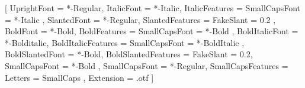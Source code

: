 \usepackage[
    math-style=ISO, bold-style=ISO,
    partial=upright,
    mathrm=sym, mathit=sym, mathsf=sym, mathbf=sym, mathtt=sym,
    warnings-off={mathtools-colon,mathtools-overbracket},
]{unicode-math}


%

\setmainfont{PalatineP}[
    UprightFont = *-Regular,
    ItalicFont = *-Italic,
    ItalicFeatures = { SmallCapsFont = *-Italic },
    SlantedFont = *-Regular,
    SlantedFeatures = { FakeSlant = 0.2 },
    BoldFont = *-Bold,
    BoldFeatures = { SmallCapsFont = *-Bold },
    BoldItalicFont = *-Bolditalic,
    BoldItalicFeatures = { SmallCapsFont = *-BoldItalic },
    BoldSlantedFont = *-Bold,
    BoldSlantedFeatures = {
            FakeSlant = 0.2,
            SmallCapsFont = *-Bold
        },
    SmallCapsFont = *-Regular,
    SmallCapsFeatures ={ Letters = SmallCaps },
    Extension = .otf
]





\AtBeginDocument{
    \renewcommand{\setminus}{\mathbin{\backslash}}%
}


\usepackage[scale=.8, nomap]{FiraMono}
